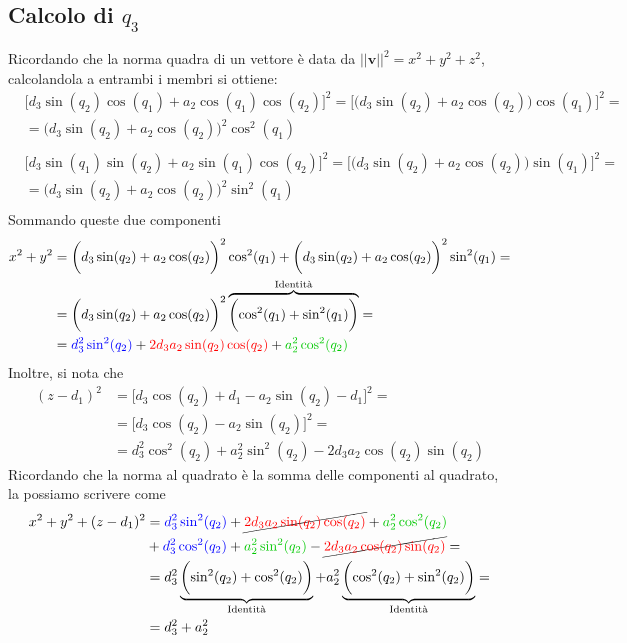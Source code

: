 ﻿\documentclass[11pt, a4paper]{article}
\begin{document}
\subsection*{Calcolo di $q_3$}
Ricordando che la norma quadra di un vettore è data da $|| \bm{v} ||^2 = x^2 + y^2 + z^2$, calcolandola a entrambi i membri si ottiene:
\begin{align*}
    &\biggl[d_3 \sin(q_2) \cos(q_1) + a_2 \cos(q_1) \cos(q_2)\biggr]^{2} =\biggl[ \biggl(d_3 \sin(q_2) + a_2 \cos(q_2)\biggr) \cos(q_1) \biggr]^{2} = \\
    &= \biggl(d_3 \sin(q_2) + a_2 \cos(q_2)\biggr)^{2} \cos^2(q_1) \\
    \\
    &\biggl[d_3 \sin(q_1) \sin(q_2) + a_2 \sin(q_1) \cos(q_2)\biggr]^{2} = \biggl[ \biggl(d_3 \sin(q_2) + a_2 \cos(q_2)\biggr) \sin(q_1) \biggr]^{2} = \\
    &= \biggl(d_3 \sin(q_2) + a_2 \cos(q_2)\biggr)^{2} \sin^2(q_1)\\
\end{align*}
Sommando queste due componenti
\begin{align*}
    x^{2} + y^{2} &= \biggl(d_3 \sin(q_2) + a_2 \cos(q_2)\biggr)^{2} \cos^2(q_1) + \biggl(d_3 \sin(q_2) + a_2 \cos(q_2)\biggr)^{2} \sin^2(q_1) = \\
    &= \biggl(d_3 \sin(q_2) + a_2 \cos(q_2)\biggr)^{2} \overbrace{\biggl(\cos^2(q_1) + \sin^2(q_1)\biggr)}^{\text{Identità}} = \\
    &= \textcolor{blue}{d_{3}^{2}\sin^{2}(q_{2})} + \textcolor{red}{2d_{3}a_{2}\sin(q_{2})\cos(q_{2})} + \textcolor{customGreen}{a_{2}^{2}\cos^{2}(q_{2})} \\
\end{align*}
Inoltre, si nota che
\begin{align*}
    (z - d_{1})^{2} &= \biggl[d_3 \cos(q_2) + d_1 - a_2 \sin(q_2) - d_{1}\biggr]^2 =\\
    &= \biggl[d_3 \cos(q_2) - a_2 \sin(q_2)\biggr]^{2} =\\
    &= d_{3}^{2} \cos^{2}(q_{2}) + a_{2}^{2} \sin^{2}(q_{2}) - 2 d_{3} a_{2} \cos(q_{2}) \sin(q_{2})
\end{align*}
Ricordando che la norma al quadrato è la somma delle componenti al quadrato, la possiamo scrivere come
\begin{align*}
    x^{2} + y^{2} + (z - d_{1})^{2} &= \textcolor{blue}{d_{3}^{2}\sin^{2}(q_{2})} + \cancel{\textcolor{red}{2d_{3}a_{2}\sin(q_{2})\cos(q_{2})}} + \textcolor{customGreen}{a_{2}^{2}\cos^{2}(q_{2})}\\
    & + \textcolor{blue}{d_{3}^{2} \cos^{2}(q_{2})} + \textcolor{customGreen}{a_{2}^{2} \sin^{2}(q_{2})} - \cancel{\textcolor{red}{2 d_{3} a_{2} \cos(q_{2}) \sin(q_{2})}} =\\
    &= d_{3}^{2} \underbrace{\biggl(\sin^{2}(q_{2}) + \cos^{2}(q_{2})\biggr)}_{\text{Identità}} + a_{2}^{2} \underbrace{\biggl(\cos^{2}(q_{2}) + \sin^{2}(q_{2})\biggr)}_{\text{Identità}} =\\
    &= d_{3}^{2} + a_{2}^{2}
\end{align*}
\end{document}
